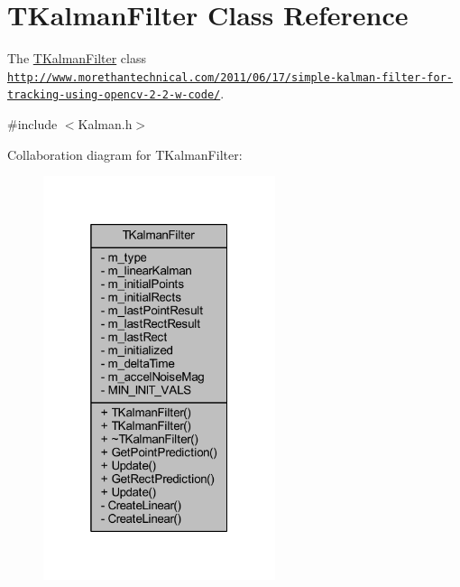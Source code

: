 \hypertarget{class_t_kalman_filter}{}\section{T\+Kalman\+Filter Class Reference}
\label{class_t_kalman_filter}


The \mbox{\hyperlink{class_t_kalman_filter}{T\+Kalman\+Filter}} class \href{http://www.morethantechnical.com/2011/06/17/simple-kalman-filter-for-tracking-using-opencv-2-2-w-code/}{\tt http\+://www.\+morethantechnical.\+com/2011/06/17/simple-\/kalman-\/filter-\/for-\/tracking-\/using-\/opencv-\/2-\/2-\/w-\/code/}.  




{\ttfamily \#include $<$Kalman.\+h$>$}



Collaboration diagram for T\+Kalman\+Filter\+:\nopagebreak
\begin{figure}[H]
\begin{center}
\leavevmode
\includegraphics[width=193pt]{class_t_kalman_filter__coll__graph}
\end{center}
\end{figure}
